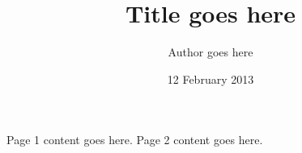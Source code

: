 \documentclass{article}
\title{Title goes here}
\author{Author goes here}
\date{12 February 2013}
\begin{document}
{\let\newpage\relax\maketitle}\thispagestyle{pageone}

\newpage
Page 1 content goes here.
\newpage
Page 2 content goes here.
\end{document}
